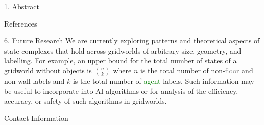\documentclass[
    a0paper, %
    landscape, %
    fontscale=0.3 %
    ]{baposter}
\begin{document}
\begin{poster}
\begin{posterbox}[
    name = abstract,  %
    column = 0, %
    ]{1. Abstract}
\end{posterbox}


\begin{posterbox}[
    name = references,  %
    column = 0, %
    above = bottom, %
    ]{References}
    \renewcommand{\section}[2]{} %
    \nocite{*} %
    
    
\end{posterbox}



\begin{posterbox}[
    name = futureresearch,  %
    column = 1, %
    span = 2,
    aligned=references,
    above=bottom
    ]{6. Future Research}
We are currently exploring patterns and theoretical aspects of state complexes that hold across gridworlds of arbitrary size, geometry, and labelling. For example, an upper bound for the total number of states of a gridworld without objects is $\binom{n}{k}$ where $n$ is the total number of non-\textcolor{gray}{floor} and non-wall labels and $k$ is the total number of \textcolor{green}{agent} labels. Such information may be useful to incorporate into AI algorithms or for analysis of the efficiency, accuracy, or safety of such algorithms in gridworlds.
\end{posterbox}


\begin{posterbox}[
    name = contact,  %
    column = 3, %
    aligned=references,
    above=bottom
    ]{Contact Information}


\end{posterbox}
\end{poster}
\end{document}
